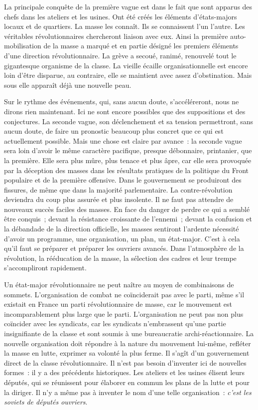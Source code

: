 \documentclass[french,twoside]{book} %
\begin{document}
La principale conquête de la première vague est dans le fait que sont apparus des chefs dans les ateliers et les usines. Ont été créés les éléments d’états-majors locaux et de quartiers. La masse les connaît. Ils se connaissent l’un l’autre. Les véritables révolutionnaires chercheront liaison avec eux. Ainsi la première auto-mobilisation de la masse a marqué et en partie désigné les premiers éléments d’une direction révolutionnaire. La grève a secoué, ranimé, renouvelé tout le gigantesque organisme de la classe. La vieille écaille organisationnelle est encore loin d’être disparue, au contraire, elle se maintient avec assez d’obstination. Mais sous elle apparaît déjà une nouvelle peau.\par
Sur le rythme des événements, qui, sans aucun doute,  s’accéléreront, nous ne dirons rien maintenant. Ici ne sont encore possibles que des suppositions et des conjectures. La seconde vague, son déclenchement et sa tension permettront, sans aucun doute, de faire un pronostic beaucoup plus concret que ce qui est actuellement possible. Mais une chose est claire par avance : la seconde vague sera loin d’avoir le même caractère pacifique, presque débonnaire, printanier, que la première. Elle sera plus mûre, plus tenace et plus âpre, car elle sera provoquée par la déception des masses dans les résultats pratiques de la politique du Front populaire et de la première offensive. Dans le gouvernement se produiront des fissures, de même que dans la majorité parlementaire. La contre-révolution deviendra du coup plus assurée et plus insolente. Il ne faut pas attendre de nouveaux succès faciles des masses. En face du danger de perdre ce qui a semblé être conquis ; devant la résistance croissante de l’ennemi ; devant la confusion et la débandade de la direction officielle, les masses sentiront l’ardente nécessité d’avoir un programme, une organisation, un plan, un état-major. C’est à cela qu’il faut se préparer et préparer les ouvriers avancés. Dans l’atmosphère de la révolution, la rééducation de la masse, la sélection des cadres et leur trempe s’accompliront rapidement.\par
Un état-major révolutionnaire ne peut naître au moyen de combinaisons de sommets. L’organisation de combat ne coïnciderait pas avec le parti, même s’il existait en France un parti révolutionnaire de masse, car le mouvement est incomparablement plus large que le parti. L’organisation ne peut pas non plus coïncider avec les syndicats, car les syndicats n’embrassent qu’une partie insignifiante de la classe et sont soumis à une bureaucratie archi-réactionnaire. La nouvelle organisation doit répondre à la nature du mouvement lui-même, refléter la masse en lutte, exprimer sa volonté la plus ferme. Il s’agît d’un gouvernement direct de la classe révolutionnaire. Il n’est pas besoin d’inventer  ici de nouvelles formes : il y a des précédents historiques. Les ateliers et les usines élisent leurs députés, qui se réunissent pour élaborer en commun les plans de la lutte et pour la diriger. Il n’y a même pas à inventer le nom d’une telle organisation : \emph{c’est les soviets de députés ouvriers}.\par
\end{document}
